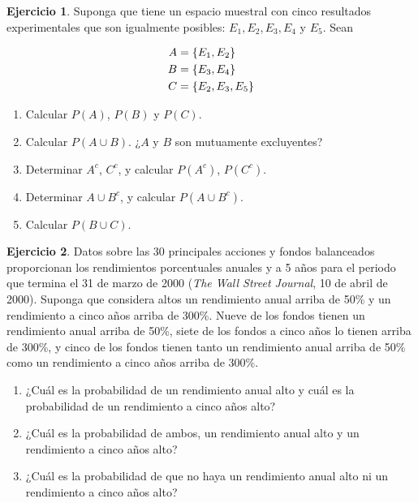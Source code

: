 \documentclass[
  11pt,
]{book}
\providecommand{\tightlist}{%
  \setlength{\itemsep}{0pt}\setlength{\parskip}{0pt}}
\theoremstyle{definition}
\theoremstyle{definition}
\theoremstyle{definition}
\newtheorem{exercise}{Ejercicio}[chapter]
\theoremstyle{definition}
\theoremstyle{remark}
\begin{document}
\begin{enumerate}
  \begin{exercise}

  Suponga que tiene un espacio muestral con cinco resultados experimentales que son igualmente posibles: \(E_1,E_2,E_3,E_4\) y \(E_5\). Sean

  \begin{equation}
  \notag
  \begin{split}
  A &= \lbrace E_1, E_2 \rbrace\\
  B &= \lbrace E_3, E_4 \rbrace\\
  C &= \lbrace E_2, E_3, E_5 \rbrace\\
  \end{split}
  \end{equation}

  \begin{enumerate}
  \def\labelenumii{\alph{enumii}.}
  \tightlist
  \item
    Calcular \(P(A)\), \(P(B)\) y \(P(C)\).
  \item
    Calcular \(P(A \cup B)\). ¿\(A\) y \(B\) son mutuamente excluyentes?
  \item
    Determinar \(A^c\), \(C^c\), y calcular \(P(A^c)\), \(P(C^c)\).
  \item
    Determinar \(A\cup B^c\), y calcular \(P(A\cup B^c)\).
  \item
    Calcular \(P(B\cup C)\).
  \end{enumerate}

  \end{exercise}

  \begin{exercise}

  Datos sobre las 30 principales acciones y fondos balanceados proporcionan los rendimientos porcentuales anuales y a 5 años para el periodo que termina el 31 de marzo de 2000 (\emph{The Wall Street Journal}, 10 de abril de 2000). Suponga que considera altos un rendimiento anual arriba de 50\% y un rendimiento a cinco años arriba de 300\%. Nueve de los fondos tienen un rendimiento anual arriba de 50\%, siete de los fondos a cinco años lo tienen arriba de 300\%, y cinco de los fondos tienen tanto un rendimiento anual arriba de 50\% como un rendimiento a cinco años arriba de 300\%.

  \begin{enumerate}
  \def\labelenumii{\alph{enumii}.}
  \tightlist
  \item
    ¿Cuál es la probabilidad de un rendimiento anual alto y cuál es la probabilidad de un rendimiento a cinco años alto?
  \item
    ¿Cuál es la probabilidad de ambos, un rendimiento anual alto y un rendimiento a cinco años alto?
  \item
    ¿Cuál es la probabilidad de que no haya un rendimiento anual alto ni un rendimiento a cinco años alto?
  \end{enumerate}


\end{exercise}
\end{enumerate}
\end{document}
